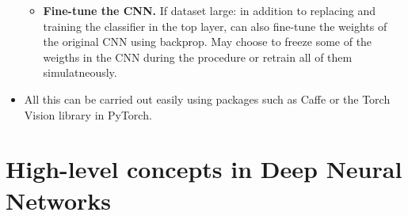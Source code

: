\documentclass[norsk,a4paper,11pt]{article}
\begin{document}
\begin{itemize}
\begin{itemize}
		\item \textbf{Fine-tune the CNN.}
		If dataset large: in addition to replacing and training the classifier in the top layer, can also fine-tune the weights of the original CNN using backprop. May choose to freeze some of the weigths in the CNN during the procedure or retrain all of them simulatneously. 
	\end{itemize}
	\item All this can be carried out easily using packages such as Caffe or the Torch Vision library in PyTorch.
\end{itemize}



\section{High-level concepts in Deep Neural Networks}
\end{document}
